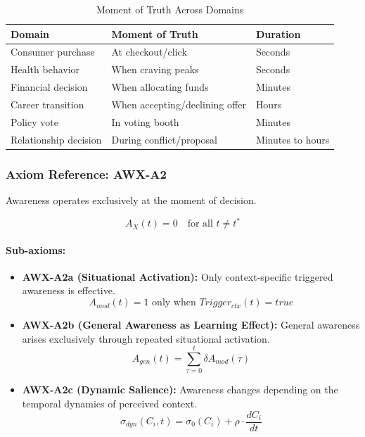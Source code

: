 \begin{table}[htbp]
\centering
\caption{Moment of Truth Across Domains}
\label{tab:moment-domains}
\renewcommand{\arraystretch}{1.3}
\begin{tabular}{@{}lll@{}}
\toprule
\textbf{Domain} & \textbf{Moment of Truth} & \textbf{Duration} \\
\midrule
Consumer purchase & At checkout/click & Seconds \\
Health behavior & When craving peaks & Seconds \\
Financial decision & When allocating funds & Minutes \\
Career transition & When accepting/declining offer & Hours \\
Policy vote & In voting booth & Minutes \\
Relationship decision & During conflict/proposal & Minutes to hours \\
\bottomrule
\end{tabular}
\end{table}

\subsubsection{Axiom Reference: AWX-A2}

\begin{axiom}
\label{ax:awx-a2-ref}
Awareness operates exclusively at the moment of decision.
\end{axiom}

\begin{equation}
A_X(t) = 0 \quad \text{for all } t \neq t^*
\end{equation}

\paragraph{Sub-axioms:}
\begin{itemize}
\item \textbf{AWX-A2a (Situational Activation):} Only context-specific triggered 
awareness is effective.
\begin{equation}
A_{mod}(t) = 1 \text{ only when } Trigger_{ctx}(t) = true
\end{equation}

\item \textbf{AWX-A2b (General Awareness as Learning Effect):} General awareness 
arises exclusively through repeated situational activation.
\begin{equation}
A_{gen}(t) = \sum_{\tau=0}^{t} \delta A_{mod}(\tau)
\end{equation}

\item \textbf{AWX-A2c (Dynamic Salience):} Awareness changes depending on the 
temporal dynamics of perceived context.
\begin{equation}
\sigma_{dyn}(C_i, t) = \sigma_0(C_i) + \rho \cdot \frac{dC_i}{dt}
\end{equation}
\end{itemize}

